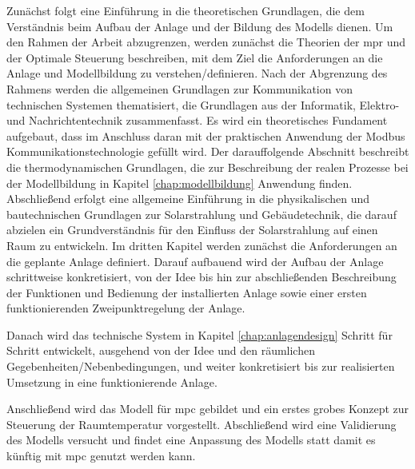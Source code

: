 Zunächst folgt eine Einführung in die theoretischen Grundlagen, die dem Verständnis beim Aufbau der Anlage und der Bildung des Modells dienen.
Um den Rahmen der Arbeit abzugrenzen, werden zunächst die Theorien der \acrlong{mpr} und der Optimale Steuerung beschreiben, mit dem Ziel die Anforderungen an die Anlage und Modellbildung zu verstehen/definieren.
Nach der Abgrenzung des Rahmens werden die allgemeinen Grundlagen zur Kommunikation von technischen Systemen thematisiert, die Grundlagen aus der Informatik, Elektro- und Nachrichtentechnik zusammenfasst. Es wird ein theoretisches Fundament aufgebaut, dass im Anschluss daran mit der praktischen Anwendung der Modbus Kommunikationstechnologie gefüllt wird.
Der darauffolgende Abschnitt beschreibt die thermodynamischen Grundlagen, die zur Beschreibung der realen Prozesse bei der Modellbildung in Kapitel \ref{chap:modellbildung} Anwendung finden.
Abschließend erfolgt eine allgemeine Einführung in die physikalischen und bautechnischen Grundlagen zur Solarstrahlung und Gebäudetechnik, die darauf abzielen ein Grundverständnis für den Einfluss der Solarstrahlung auf einen Raum zu entwickeln.
Im dritten Kapitel werden zunächst die Anforderungen an die geplante Anlage definiert. Darauf aufbauend wird der Aufbau der Anlage schrittweise konkretisiert, von der Idee bis hin zur abschließenden Beschreibung der Funktionen und Bedienung der installierten Anlage sowie einer ersten funktionierenden Zweipunktregelung der Anlage.


Danach wird das technische System in Kapitel \ref{chap:anlagendesign} Schritt für Schritt entwickelt, ausgehend von der Idee und den räumlichen Gegebenheiten/Nebenbedingungen, und weiter konkretisiert bis zur realisierten Umsetzung in eine funktionierende Anlage.

Anschließend wird das Modell für \acrlong{mpc} gebildet und ein erstes grobes Konzept zur Steuerung der Raumtemperatur vorgestellt. Abschließend wird eine Validierung des Modells versucht und findet eine Anpassung des Modells statt damit es künftig mit \acrlong{mpc} genutzt werden kann.